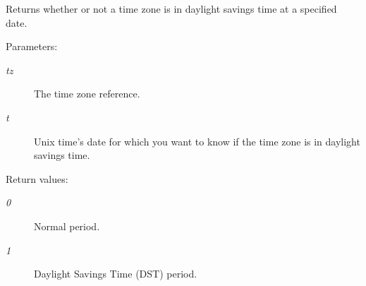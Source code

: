 Returns whether or not a time zone is in daylight savings time at a specified date. 

\begin{Desc}
\item[Parameters:]
\begin{description}
\item[{\em tz}]The time zone reference. \item[{\em t}]Unix time's date for which you want to know if the time zone is in daylight savings time.\end{description}
\end{Desc}
\begin{Desc}
\item[Return values:]
\begin{description}
\item[{\em 0}]Normal period. \item[{\em 1}]Daylight Savings Time (DST) period. \end{description}
\end{Desc}
